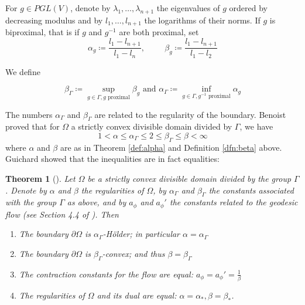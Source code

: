 \documentclass[letterpaper, 11pt, reqno]{amsart}
\newtheorem{thm}{Theorem}[section]
\theoremstyle{definition}
\begin{document}
For $g \in PGL(V)$, denote by $\lambda_1,\dots,\lambda_{n+1}$ the eigenvalues of $g$ ordered by decreasing modulus and by $l_1,\dots,l_{n+1}$ the logarithms of their norms. If $g$ is biproximal, that is if $g$ and $g^{-1}$ are both proximal, set
\begin{equation}
    \alpha_g \coloneq \frac{l_1-l_{n+1}}{l_1-l_n}, \hspace{1cm} \beta_g \coloneq \frac{l_1-l_{n+1}}{l_1-l_2}
\end{equation}

We define

\begin{equation}
    \beta_\Gamma \coloneq \sup_{g \in \Gamma, g \text{ proximal}}\beta_g \text{    and    } \alpha_\Gamma \coloneq \inf_{g\in\Gamma, g^{-1} \text{ proximal}}\alpha_g
\end{equation}

The numbers $\alpha_\Gamma$ and $\beta_\Gamma$ are related to the regularity of the boundary. Benoist proved that for $\Omega$ a strictly convex divisible domain divided by $\Gamma$, we have
    \begin{equation}
        1 < \alpha \leq \alpha_\Gamma \leq 2 \leq \beta_\Gamma \leq \beta < \infty
    \end{equation}
    where $\alpha$ and $\beta$ are as in Theorem \ref{def:alpha} and Definition  \ref{dfn:beta} above. Guichard showed that the inequalities are in fact equalities:

\begin{thm}[\cite{Guichard}]
    Let $\Omega$ be a strictly convex divisible domain divided by the group $\Gamma$. Denote by $\alpha$ and $\beta$ the regularities of $\Omega$, by $\alpha_\Gamma$ and $\beta_\Gamma$ the constants associated with the group $\Gamma$ as above, and by $a_\phi$ and $a_\phi'$ the constants related to the geodesic flow (see Section 4.4 of \cite{Guichard}). Then
    \begin{enumerate}
        \item The boundary $\partial \Omega$ is $\alpha_\Gamma$-H{\"o}lder; in particular $\alpha = \alpha_\Gamma$
        \item The boundary $\partial \Omega$ is $\beta_\Gamma$-convex; and thus $\beta = \beta_\Gamma$
        \item The contraction constants for the flow are equal: $a_\phi=a_\phi' = \frac{1}{\beta}$
        \item The regularities of $\Omega$ and its dual are equal: $\alpha=\alpha_*, \beta = \beta_*$.
    \end{enumerate}
\end{thm}
\end{document}
